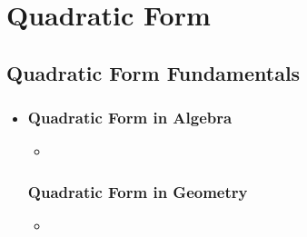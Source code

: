 \chapter{Quadratic Form}\label{Quadratic Form}

\section{Quadratic Form Fundamentals}\label{Quadratic Form Fundamentals}
\begin{itemize}
  \item[]

  \subsection{Quadratic Form in Algebra}\label{Quadratic Form in Algebra}
  \begin{itemize}
    \item 
  \end{itemize}
  
  \subsection{Quadratic Form in Geometry}\label{Quadratic Form in Geometry}
  \begin{itemize}
    \item 
  \end{itemize}

\end{itemize}

